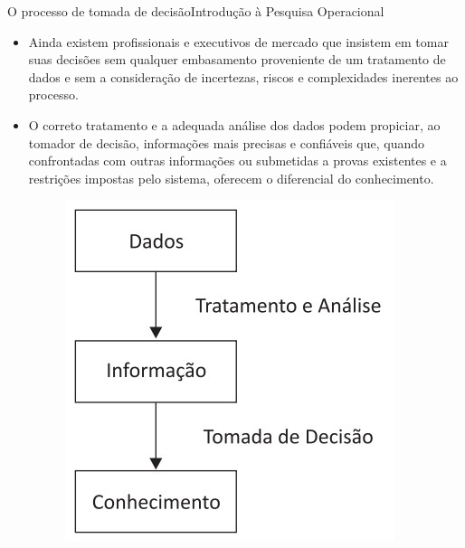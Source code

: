 \documentclass[t]{beamer}
\begin{document}
\begin{ftst}{O processo de tomada de decisão}{Introdução à Pesquisa Operacional}
\small
\begin{itemize}
    \item Ainda existem profissionais e executivos de mercado que insistem em tomar suas decisões sem qualquer embasamento proveniente de um tratamento de dados e sem a consideração de incertezas, riscos e complexidades inerentes ao processo.
    \item O correto tratamento e a adequada análise dos dados podem propiciar, ao tomador de decisão, informações mais precisas e confiáveis que, quando confrontadas com outras informações ou submetidas a provas existentes e a restrições impostas pelo sistema, oferecem o diferencial do conhecimento.
    \begin{figure}
        \centering
        \includegraphics[scale=0.3]{Figuras/conhecimento.jpg}
    \end{figure}
    \end{itemize}

\end{ftst}

\end{document}
